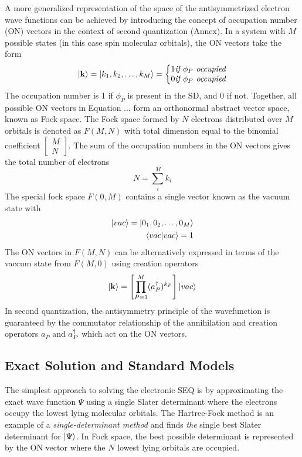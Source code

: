 A more generalized representation of the space of the antisymmetrized electron wave functions can be achieved by introducing the concept of occupation number (ON) vectors in the context of second quantization (Annex). In a system with $M$ possible states (in this case spin molecular orbitals), the ON vectors take the form
\begin{equation}
\ket{\mathbf{k}} = \ket{k_1, k_2, \ldots, k_M} = 
\left\lbrace
\begin{matrix}
1 \textit{if $\phi_P$ occupied} \\
0  \textit{if $\phi_P$ occupied}
\end{matrix}
\right.
\end{equation}
\noindent The occupation number is 1 if $\phi_P$ is present in the SD, and 0 if not. Together, all possible ON vectors in Equation ... form an orthonormal abstract vector space, known as Fock space. The Fock space formed by $N$ electrons distributed over $M$ orbitals is denoted as $F(M,N)$ with total dimension equal to the binomial coefficient $\begin{bmatrix} M \\ N \end{bmatrix}$. The sum of the occupation numbers in the ON vectors gives the total number of electrons
\begin{equation}
N = \sum_i^M k_i
\end{equation}
\noindent The special fock space $F(0,M)$ contains a single vector known as the vacuum state with
\begin{align}
\ket{vac} = \ket{0_1, 0_2, \ldots, 0_M} \\
\bra{vac}\ket{vac} = 1
\end{align}
\noindent The ON vectors in $F(M,N)$ can be alternatively expressed in terms of the vaccum state from $F(M,0)$ using creation operators
\begin{equation}
\ket{\mathbf{k}} = \left[ \prod_{P=1}^M (a^{\dagger}_P)^{k_P} \right] \ket{vac}
\end{equation}
\noindent In second quantization, the antisymmetry principle of the wavefunction is guaranteed by the commutator relationship of the annihilation and creation operators $a_P$ and $a^{\dagger}_P$ which act on the ON vectors.

\subsection{Exact Solution and Standard Models}

The simplest approach to solving the electronic SEQ is by approximating the exact wave function $\Psi$ using a single Slater determinant where the electrons occupy the lowest lying molecular orbitals. The Hartree-Fock method is an example of a \emph{single-determinant method} and finds \emph{the} single best Slater determinant for $\ket{\Psi}$. In Fock space, the best possible determinant is represented by the ON vector where the $N$ lowest lying orbitals are occupied. 

